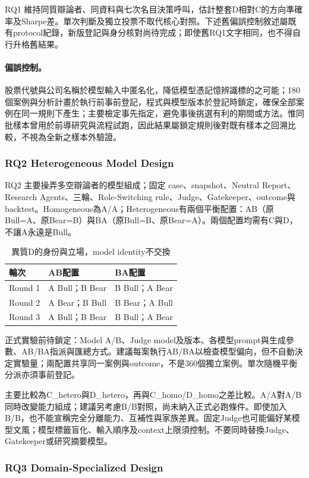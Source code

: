 \documentclass[12pt,a4paper]{article}
\begin{document}
\begin{CJK}{UTF8}{bkai}
RQ1 維持同質辯論者、同資料與七次名目決策呼叫，估計整套D相對C的方向準確率及Sharpe差。單次判斷及獨立投票不取代核心對照。下述舊偏誤控制敘述屬既有protocol紀錄，新版登記與身分核對尚待完成；即使舊RQ1文字相同，也不得自行升格舊結果。
\paragraph{偏誤控制。} 股票代號與公司名稱於模型輸入中匿名化，降低模型憑記憶辨識標的之可能；180 個案例與分析計畫於執行前事前登記，程式與模型版本於登記時鎖定，確保全部案例在同一規則下產生；主要檢定事先指定，避免事後挑選有利的期間或方法。惟同批樣本曾用於前導研究與流程試跑，因此結果屬鎖定規則後對既有樣本之回溯比較，不視為全新之樣本外驗證。


\subsubsection{RQ2 Heterogeneous Model Design}

RQ2 主要操弄多空辯論者的模型組成；固定 case、snapshot、Neutral Report、Research Agents、三輪、Role-Switching rule、Judge、Gatekeeper、outcome與backtest。Homogeneous為A/A；Heterogeneous有兩個平衡配置：AB（原Bull=A、原Bear=B）與BA（原Bull=B、原Bear=A）。兩個配置均需有C與D，不讓A永遠是Bull。
\begin{table}[H]\centering\small
\caption{異質D的身份與立場，model identity不交換}
\begin{tabularx}{\textwidth}{@{}lYY@{}}\toprule
輪次 & AB配置 & BA配置\\\midrule
Round 1 & A Bull；B Bear & B Bull；A Bear\\
Round 2 & A Bear；B Bull & B Bear；A Bull\\
Round 3 & A Bull；B Bear & B Bull；A Bear\\\bottomrule\end{tabularx}\end{table}
正式實驗前待鎖定：Model A/B、Judge model及版本、各模型prompt與生成參數、AB/BA指派與匯總方式。建議每案執行AB/BA以檢查模型偏向，但不自動決定實驗量；兩配置共享同一案例與outcome，不是360個獨立案例。單次隨機平衡分派亦須事前登記。

主要比較為C\_hetero與D\_hetero，再與C\_homo/D\_homo之差比較。A/A對A/B同時改變能力組成；建議另考慮B/B對照，尚未納入正式必跑條件。即使加入B/B，也不能宣稱完全分離能力、互補性與家族差異。固定Judge也可能偏好某模型文風；模型標籤盲化、輸入順序及context上限須控制。不要同時替換Judge、Gatekeeper或研究摘要模型。

\subsubsection{RQ3 Domain-Specialized Design}


\end{CJK}
\end{document}
